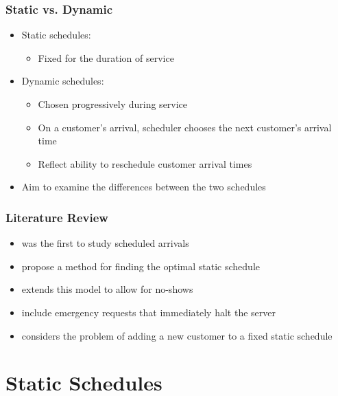 \documentclass{beamer}
\begin{document}
\begin{frame}
	\frametitle{Static vs. Dynamic}

	\begin{itemize}
		\item Static schedules:
		\begin{itemize}
			\item Fixed for the duration of service
		\end{itemize}
		\item Dynamic schedules:
		\begin{itemize}
		 	\item Chosen progressively during service
		 	\item On a customer's arrival, scheduler chooses the next customer's arrival time
		 	\item Reflect ability to reschedule customer arrival times
		 \end{itemize}
		\item Aim to examine the differences between the two schedules
	\end{itemize}
\end{frame}

\begin{frame}
	\frametitle{Literature Review}

	\begin{itemize}
		\item \citet{Bailey} was the first to study scheduled arrivals
		\item \citet{Pegden} propose a method for finding the optimal static schedule
		\item \citet{Mendel} extends this model to allow for no-shows
		\item \citet{Fiems} include emergency requests that immediately halt the server
		\item \citet{Wang} considers the problem of adding a new customer to a fixed static schedule
	\end{itemize}
\end{frame}

\section{Static Schedules}
\end{document}
